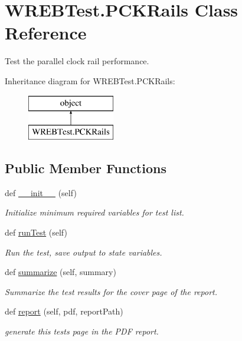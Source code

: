 \hypertarget{class_w_r_e_b_test_1_1_p_c_k_rails}{}\section{W\+R\+E\+B\+Test.\+P\+C\+K\+Rails Class Reference}
\label{class_w_r_e_b_test_1_1_p_c_k_rails}


Test the parallel clock rail performance.  


Inheritance diagram for W\+R\+E\+B\+Test.\+P\+C\+K\+Rails\+:\begin{figure}[H]
\begin{center}
\leavevmode
\includegraphics[height=2.000000cm]{class_w_r_e_b_test_1_1_p_c_k_rails}
\end{center}
\end{figure}
\subsection*{Public Member Functions}
\begin{DoxyCompactItemize}
\item 
def \hyperlink{class_w_r_e_b_test_1_1_p_c_k_rails_a09480a5ceddb45da89954585ca9a8d7b}{\+\_\+\+\_\+init\+\_\+\+\_\+} (self)
\begin{DoxyCompactList}\small\item\em Initialize minimum required variables for test list. \end{DoxyCompactList}\item 
def \hyperlink{class_w_r_e_b_test_1_1_p_c_k_rails_a5e706f60ff883d7222b185e082ea7182}{run\+Test} (self)
\begin{DoxyCompactList}\small\item\em Run the test, save output to state variables. \end{DoxyCompactList}\item 
def \hyperlink{class_w_r_e_b_test_1_1_p_c_k_rails_a905d8777dfc5419eca9975e0318cc0ea}{summarize} (self, summary)
\begin{DoxyCompactList}\small\item\em Summarize the test results for the cover page of the report. \end{DoxyCompactList}\item 
def \hyperlink{class_w_r_e_b_test_1_1_p_c_k_rails_adf95962b2cef78500fec421e91542f6a}{report} (self, pdf, report\+Path)
\begin{DoxyCompactList}\small\item\em generate this test\textquotesingle{}s page in the P\+DF report. \end{DoxyCompactList}\end{DoxyCompactItemize}


